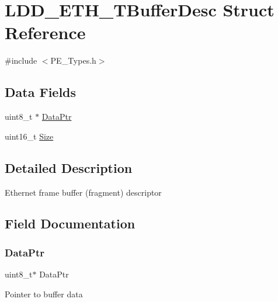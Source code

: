 \hypertarget{struct_l_d_d___e_t_h___t_buffer_desc}{}\section{L\+D\+D\+\_\+\+E\+T\+H\+\_\+\+T\+Buffer\+Desc Struct Reference}
\label{struct_l_d_d___e_t_h___t_buffer_desc}


{\ttfamily \#include $<$P\+E\+\_\+\+Types.\+h$>$}

\subsection*{Data Fields}
\begin{DoxyCompactItemize}
\item 
uint8\+\_\+t $\ast$ \hyperlink{struct_l_d_d___e_t_h___t_buffer_desc_ad076d2b6eaae6f9b32363de4729e9349}{Data\+Ptr}
\item 
uint16\+\_\+t \hyperlink{struct_l_d_d___e_t_h___t_buffer_desc_a7da24467a0654ce2d1b0d8d0a09eee4b}{Size}
\end{DoxyCompactItemize}


\subsection{Detailed Description}
Ethernet frame buffer (fragment) descriptor 

\subsection{Field Documentation}
\mbox{\label{struct_l_d_d___e_t_h___t_buffer_desc_ad076d2b6eaae6f9b32363de4729e9349}} 
\subsubsection{\texorpdfstring{Data\+Ptr}{DataPtr}}
{\footnotesize\ttfamily uint8\+\_\+t$\ast$ Data\+Ptr}

Pointer to buffer data \mbox{\label{struct_l_d_d___e_t_h___t_buffer_desc_a7da24467a0654ce2d1b0d8d0a09eee4b}} 
